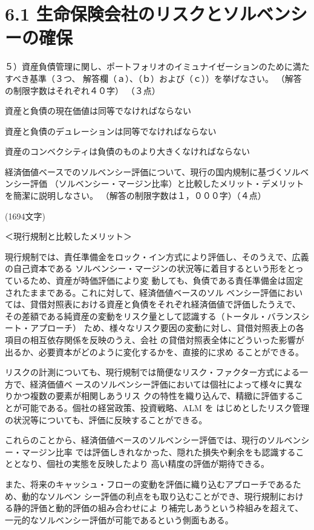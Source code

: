 \documentclass[report,gutter=10mm,fore-edge=10mm,uplatex,dvipdfmx]{jlreq}
\begin{document}
\section{6.1 生命保険会社のリスクとソルベンシーの確保}
５）資産負債管理に関し、ポートフォリオのイミュナイゼーションのために満たすべき基準（３つ、
解答欄（ａ）、（ｂ）および（ｃ））を挙げなさい。
（解答の制限字数はそれぞれ４０字）
（３点）

\answer{}
資産と負債の現在価値は同等でなければならない

資産と負債のデュレーションは同等でなければならない

資産のコンベクシティは負債のものより大きくなければならない

経済価値ベースでのソルベンシー評価について、現行の国内規制に基づくソルベンシー評価
（ソルベンシー・マージン比率）と比較したメリット・デメリットを簡潔に説明しなさい。
（解答の制限字数は１，０００字）（４点）

\answer{}
(1694文字)

＜現行規制と比較したメリット＞

 現行規制では、責任準備金をロック・イン方式により評価し、そのうえで、広義の自己資本である
ソルベンシー・マージンの状況等に着目するという形をとっているため、資産が時価評価により変
動しても、負債である責任準備金は固定されたままである。これに対して、経済価値ベースのソル
ベンシー評価においては、貸借対照表における資産と負債をそれぞれ経済価値で評価したうえで、
その差額である純資産の変動をリスク量として認識する（トータル・バランスシート・アプローチ）
ため、様々なリスク要因の変動に対し、貸借対照表上の各項目の相互依存関係を反映のうえ、会社
の貸借対照表全体にどういった影響が出るか、必要資本がどのように変化するかを、直接的に求め
ることができる。

 リスクの計測についても、現行規制では簡便なリスク・ファクター方式による一方で、経済価値ベ
ースのソルベンシー評価においては個社によって様々に異なりかつ複数の要素が相関しあうリス
クの特性を織り込んで、精緻に評価することが可能である。個社の経営政策、投資戦略、ALM を
はじめとしたリスク管理の状況等についても、評価に反映することができる。

 これらのことから、経済価値ベースのソルベンシー評価では、現行のソルベンシー・マージン比率
では評価しきれなかった、隠れた損失や剰余をも認識することとなり、個社の実態を反映したより
高い精度の評価が期待できる。

また、将来のキャッシュ・フローの変動を評価に織り込むアプローチであるため、動的なソルベン
シー評価の利点をも取り込むことができ、現行規制における静的評価と動的評価の組み合わせによ
り補完しあうという枠組みを超えて、一元的なソルベンシー評価が可能であるという側面もある。
\end{document}
